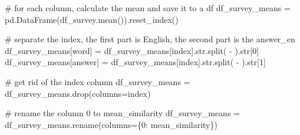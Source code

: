 \documentclass[
  letterpaper,
  DIV=11,
  numbers=noendperiod]{scrreprt}
\newenvironment{Shaded}{\begin{snugshade}}{\end{snugshade}}
\newcommand{\BuiltInTok}[1]{\textcolor[rgb]{0.00,0.23,0.31}{#1}}
\newcommand{\CommentTok}[1]{\textcolor[rgb]{0.37,0.37,0.37}{#1}}
\newcommand{\DecValTok}[1]{\textcolor[rgb]{0.68,0.00,0.00}{#1}}
\newcommand{\NormalTok}[1]{\textcolor[rgb]{0.00,0.23,0.31}{#1}}
\newcommand{\OperatorTok}[1]{\textcolor[rgb]{0.37,0.37,0.37}{#1}}
\newcommand{\StringTok}[1]{\textcolor[rgb]{0.13,0.47,0.30}{#1}}
\begin{document}
\begin{Shaded}
\begin{Highlighting}[]
\CommentTok{\# for each column, calculate the mean and save it to a df}
\NormalTok{df\_survey\_means }\OperatorTok{=}\NormalTok{ pd.DataFrame(df\_survey.mean()).reset\_index()}

\CommentTok{\# separate the index, the first part is English, the second part is the answer\_en}
\NormalTok{df\_survey\_means[}\StringTok{\textquotesingle{}word\textquotesingle{}}\NormalTok{] }\OperatorTok{=}\NormalTok{ df\_survey\_means[}\StringTok{\textquotesingle{}index\textquotesingle{}}\NormalTok{].}\BuiltInTok{str}\NormalTok{.split(}\StringTok{\textquotesingle{} {-} \textquotesingle{}}\NormalTok{).}\BuiltInTok{str}\NormalTok{[}\DecValTok{0}\NormalTok{]}
\NormalTok{df\_survey\_means[}\StringTok{\textquotesingle{}answer\textquotesingle{}}\NormalTok{] }\OperatorTok{=}\NormalTok{ df\_survey\_means[}\StringTok{\textquotesingle{}index\textquotesingle{}}\NormalTok{].}\BuiltInTok{str}\NormalTok{.split(}\StringTok{\textquotesingle{} {-} \textquotesingle{}}\NormalTok{).}\BuiltInTok{str}\NormalTok{[}\DecValTok{1}\NormalTok{]}

\CommentTok{\# get rid of the index column}
\NormalTok{df\_survey\_means }\OperatorTok{=}\NormalTok{ df\_survey\_means.drop(columns}\OperatorTok{=}\StringTok{\textquotesingle{}index\textquotesingle{}}\NormalTok{)}

\CommentTok{\# rename the column 0 to mean\_similarity}
\NormalTok{df\_survey\_means }\OperatorTok{=}\NormalTok{ df\_survey\_means.rename(columns}\OperatorTok{=}\NormalTok{\{}\DecValTok{0}\NormalTok{: }\StringTok{\textquotesingle{}mean\_similarity\textquotesingle{}}\NormalTok{\})}


\end{Highlighting}
\end{Shaded}
\end{document}
